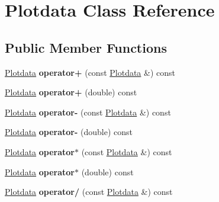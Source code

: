 \hypertarget{class_plotdata}{}\section{Plotdata Class Reference}
\label{class_plotdata}
\subsection*{Public Member Functions}
\begin{DoxyCompactItemize}
\item 
\hyperlink{class_plotdata}{Plotdata} {\bfseries operator+} (const \hyperlink{class_plotdata}{Plotdata} \&) const \hypertarget{class_plotdata_a346878240237293ccaa16f424ee68292}{}\label{class_plotdata_a346878240237293ccaa16f424ee68292}

\item 
\hyperlink{class_plotdata}{Plotdata} {\bfseries operator+} (double) const \hypertarget{class_plotdata_a9f5a0fc10682f9d49e1a5107d756a4c8}{}\label{class_plotdata_a9f5a0fc10682f9d49e1a5107d756a4c8}

\item 
\hyperlink{class_plotdata}{Plotdata} {\bfseries operator-\/} (const \hyperlink{class_plotdata}{Plotdata} \&) const \hypertarget{class_plotdata_a4ffd434c97b903d770fb5617607f3c1b}{}\label{class_plotdata_a4ffd434c97b903d770fb5617607f3c1b}

\item 
\hyperlink{class_plotdata}{Plotdata} {\bfseries operator-\/} (double) const \hypertarget{class_plotdata_ae9269f29144ed4e8f71c108aa471a13d}{}\label{class_plotdata_ae9269f29144ed4e8f71c108aa471a13d}

\item 
\hyperlink{class_plotdata}{Plotdata} {\bfseries operator$\ast$} (const \hyperlink{class_plotdata}{Plotdata} \&) const \hypertarget{class_plotdata_a56115565f86ae18b5114ce64e49b1bed}{}\label{class_plotdata_a56115565f86ae18b5114ce64e49b1bed}

\item 
\hyperlink{class_plotdata}{Plotdata} {\bfseries operator$\ast$} (double) const \hypertarget{class_plotdata_acade4fd5cf6db93b982d25aaf2bb64aa}{}\label{class_plotdata_acade4fd5cf6db93b982d25aaf2bb64aa}

\item 
\hyperlink{class_plotdata}{Plotdata} {\bfseries operator/} (const \hyperlink{class_plotdata}{Plotdata} \&) const \hypertarget{class_plotdata_a727580d80a3766893c0b2337ebd361c5}{}\label{class_plotdata_a727580d80a3766893c0b2337ebd361c5}


\end{DoxyCompactItemize}
